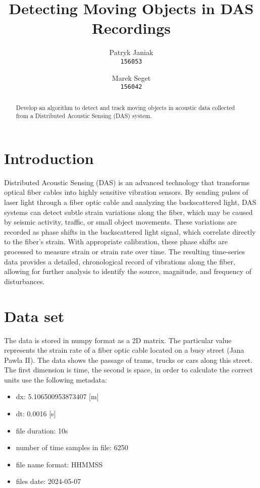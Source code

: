 \documentclass{article}
\title{Detecting Moving Objects in DAS Recordings}
\author{
  Patryk Janiak\\
  \texttt{156053}
  \and
  Marek Seget\\
  \texttt{156042}
}
\begin{document}
\maketitle

\begin{abstract}
Develop an algorithm to detect and track moving objects in acoustic data collected from a Distributed Acoustic Sensing (DAS) system.
\end{abstract}

\section{Introduction}
Distributed Acoustic Sensing (DAS) is an advanced technology that transforms optical fiber cables into highly sensitive vibration sensors. By sending pulses of laser light through a fiber optic cable and analyzing the backscattered light, DAS systems can detect subtle strain variations along the fiber, which may be caused by seismic activity, traffic, or small object movements. These variations are recorded as phase shifts in the backscattered light signal, which correlate directly to the fiber's strain. With appropriate calibration, these phase shifts are processed to measure strain or strain rate over time. The resulting time-series data provides a detailed, chronological record of vibrations along the fiber, allowing for further analysis to identify the source, magnitude, and frequency of disturbances.

\section{Data set}
The data is stored in numpy format as a 2D matrix. The particular value represents the strain rate of a fiber optic cable located on a busy street (Jana Pawla II). The data shows the passage of trams, trucks or cars along this street.
The first dimension is time, the second is space, in order to calculate the correct units use the following metadata:

\begin{multicols}{2}
\begin{itemize}
\item dx: 5.106500953873407 [m]
\item dt: 0.0016 [s]
\item file duration: 10s
\item number of time samples in file: 6250
\item file name format: HHMMSS
\item files date: 2024-05-07
\end{itemize}
\end{multicols}
\end{document}
